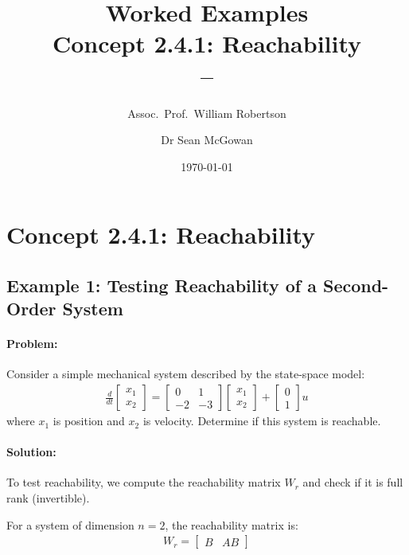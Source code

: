 \documentclass[11pt,a4paper]{article}
\title{\textbf{Worked Examples}\\[0.5em]
\large Concept 2.4.1: Reachability\\[0.3em]
\normalsize \coursesubtitle{} -- \coursetitle}
\author{Assoc.\ Prof.\ William Robertson \and Dr Sean McGowan}
\date{\today}
\begin{document}
\maketitle
\tableofcontents
\newpage

\section{Concept 2.4.1: Reachability}

\subsection{Example 1: Testing Reachability of a Second-Order System}

\paragraph{Problem:} Consider a simple mechanical system described by the state-space model:
\begin{align}
  \frac{d}{dt}\begin{bmatrix} x_1 \\ x_2 \end{bmatrix} = \begin{bmatrix} 0 & 1 \\ -2 & -3 \end{bmatrix}\begin{bmatrix} x_1 \\ x_2 \end{bmatrix} + \begin{bmatrix} 0 \\ 1 \end{bmatrix}u
\end{align}
where $x_1$ is position and $x_2$ is velocity. Determine if this system is reachable.

\paragraph{Solution:}

To test reachability, we compute the reachability matrix $W_r$ and check if it is full rank (invertible).

For a system of dimension $n=2$, the reachability matrix is:
\begin{align}
  W_r = \begin{bmatrix} B & AB \end{bmatrix}
\end{align}
\end{document}
